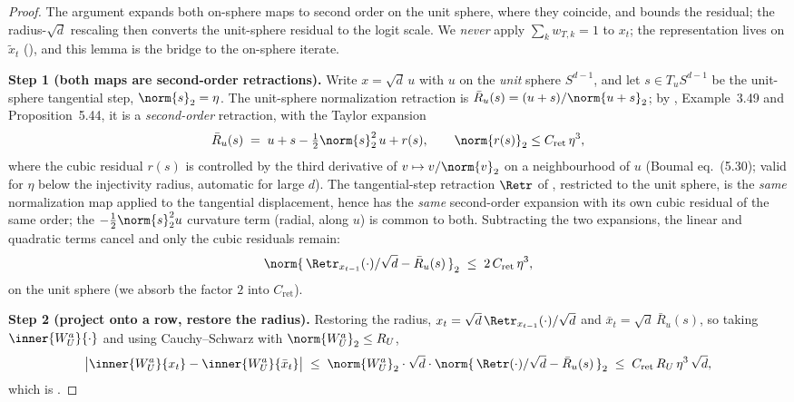 \begin{proof}
The argument expands both on-sphere maps to second order on the unit
sphere, where they coincide, and bounds the residual; the radius-$\sqrt d$
rescaling then converts the unit-sphere residual to the logit scale. We
\emph{never} apply $\sum_k w_{T,k}=1$ to $x_t$; the representation lives on
$\tilde x_t$ (), and this lemma is the bridge to
the on-sphere iterate.

\smallskip\noindent\textbf{Step 1 (both maps are second-order retractions).}
Write $x=\sqrt d\,u$ with $u$ on the \emph{unit} sphere $S^{d-1}$, and let
$s\in T_u S^{d-1}$ be the unit-sphere tangential step, $\norm{s}_2=\eta$.
The unit-sphere normalization retraction is $\bar R_u(s)=(u+s)/\norm{u+s}_2$;
by \cite{boumal2023}, Example~3.49 and Proposition~5.44, it is a
\emph{second-order} retraction, with the Taylor expansion
\begin{align}\label{eq:retr_taylor}
   \bar R_u(s) \;=\; u + s - \tfrac12\norm{s}_2^2\,u + r(s),
   \qquad \norm{r(s)}_2\le C_{\mathrm{ret}}\,\eta^3,
\end{align}
where the cubic residual $r(s)$ is controlled by the third derivative of
$v\mapsto v/\norm{v}_2$ on a neighbourhood of $u$ (Boumal eq.~(5.30); valid
for $\eta$ below the injectivity radius, automatic for large $d$). The
tangential-step retraction $\Retr$ of , restricted to
the unit sphere, is the \emph{same} normalization map applied to the
tangential displacement, hence has the \emph{same} second-order expansion
 with its own cubic residual of the same order; the
$-\tfrac12\norm{s}_2^2u$ curvature term (radial, along $u$) is common to
both. Subtracting the two expansions, the linear and quadratic terms cancel
and only the cubic residuals remain:
\begin{align*}
   \norm{\,\Retr_{x_{t-1}}(\cdot)/\sqrt d - \bar R_u(s)\,}_2
   \;\le\; 2\,C_{\mathrm{ret}}\,\eta^3,
\end{align*}
on the unit sphere (we absorb the factor $2$ into $C_{\mathrm{ret}}$).

\smallskip\noindent\textbf{Step 2 (project onto a row, restore the radius).}
Restoring the radius, $x_t=\sqrt d\,\Retr_{x_{t-1}}(\cdot)/\sqrt d$ and
$\bar x_t=\sqrt d\,\bar R_u(s)$, so taking $\inner{W_U^a}{\cdot}$ and using
Cauchy--Schwarz with $\norm{W_U^a}_2\le R_U$,
\begin{align*}
   \bigl|\inner{W_U^a}{x_t}-\inner{W_U^a}{\bar x_t}\bigr|
   \;\le\; \norm{W_U^a}_2\cdot\sqrt d\cdot\norm{\,\Retr(\cdot)/\sqrt d-\bar R_u(s)\,}_2
   \;\le\; C_{\mathrm{ret}}\,R_U\,\eta^3\,\sqrt d,
\end{align*}
which is .


\end{proof}
